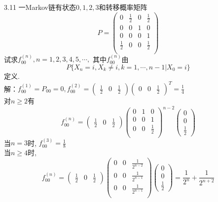 3.11 一Markov链有状态$0,1,2,3$和转移概率矩阵
\[
P =
\begin{pmatrix}
0 & \frac{1}{2} & 0 & \frac{1}{2}\\
0 & 0 & 1 & 0\\
0 & 0 & 0 & 1\\
\frac{1}{2} & 0 & 0 & \frac{1}{2}\\
\end{pmatrix}
\]
试求$f^{(n)}_{00}, n = 1,2,3,4,5,\cdots, $ 其中$f^{(n)}_{00}$由
\[
P\{X_n = i, X_k \neq i, k = 1, \cdots, n-1 | X_0 = i\}
\]
定义.\\
解：$f^{(1)}_{00} = P_{00} = 0, f^{(2)}_{00} = \begin{pmatrix}\frac{1}{2} & 0 & \frac{1}{2}\end{pmatrix}\begin{pmatrix}0 & 0 & \frac{1}{2}\end{pmatrix}^T = \frac{1}{4} $\\
对$n \geqslant 2$有
\[
f^{(n)}_{00} = \begin{pmatrix}\frac{1}{2} & 0 & \frac{1}{2}\end{pmatrix}
	\begin{pmatrix}
	0 & 1 & 0 \\
	0 & 0 & 1 \\
	0 & 0 & \frac{1}{2}\\
	\end{pmatrix}^{n-2}
	\begin{pmatrix}0 \\ 0 \\ \frac{1}{2}\end{pmatrix}
\]
当$n=3$时, $f^{(3)}_{00} = \frac{1}{8}$\\
当$n \geqslant 4$时,
\[
f^{(n)}_{00} = \begin{pmatrix}\frac{1}{2} & 0 & \frac{1}{2}\end{pmatrix}
	\begin{pmatrix}
	0 & 0 & \frac{1}{2^{n-2}}\\
	0 & 0 & \frac{1}{2^{n-1}}\\
	0 & 0 & \frac{1}{2^{n-1}}\\
	\end{pmatrix}
	\begin{pmatrix}0 \\ 0 \\ \frac{1}{2}\end{pmatrix}
	= \frac{1}{2^n} + \frac{1}{2^{n+2}}
\]


